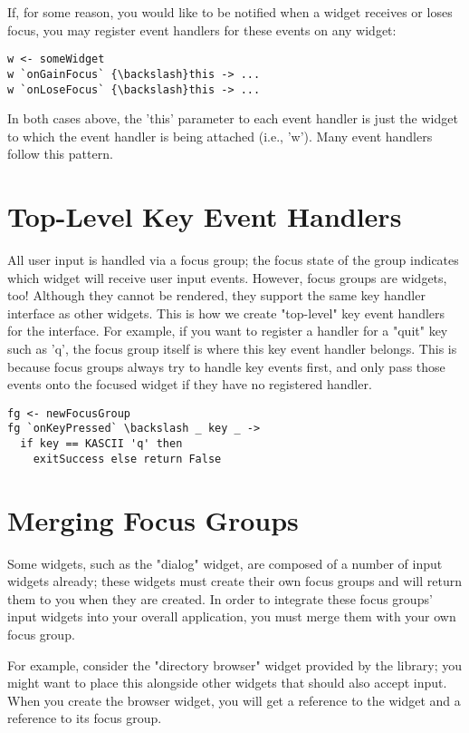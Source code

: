 \documentclass[11pt, letterpaper, oneside, titlepage]{article}
\begin{document}
If, for some reason, you would like to be notified when a widget
receives or loses focus, you may register event handlers for these
events on any widget:

\begin{verbatim}
w <- someWidget
w `onGainFocus` {\backslash}this -> ...
w `onLoseFocus` {\backslash}this -> ...
\end{verbatim}

In both cases above, the 'this' parameter to each event handler is just
the widget to which the event handler is being attached (i.e., 'w').
Many event handlers follow this pattern.

\section{Top-Level Key Event Handlers}

All user input is handled via a focus group; the focus state of the
group indicates which widget will receive user input events.  However,
focus groups are widgets, too!  Although they cannot be rendered, they
support the same key handler interface as other widgets.  This is how we
create "top-level" key event handlers for the interface.  For example,
if you want to register a handler for a "quit" key such as 'q', the
focus group itself is where this key event handler belongs.  This is
because focus groups always try to handle key events first, and only
pass those events onto the focused widget if they have no registered
handler.

\begin{verbatim}
fg <- newFocusGroup
fg `onKeyPressed` \backslash _ key _ ->
  if key == KASCII 'q' then
    exitSuccess else return False
\end{verbatim}

\section{Merging Focus Groups}

Some widgets, such as the "dialog" widget, are composed of a number of
input widgets already; these widgets must create their own focus groups
and will return them to you when they are created.  In order to
integrate these focus groups' input widgets into your overall
application, you must merge them with your own focus group.

For example, consider the "directory browser" widget provided by the
library; you might want to place this alongside other widgets that
should also accept input.  When you create the browser widget, you will
get a reference to the widget and a reference to its focus group.
\end{document}
